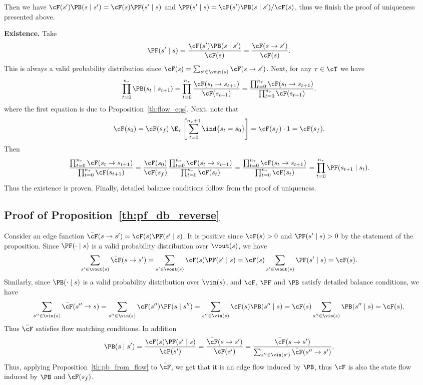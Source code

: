 Then we have $\cF(s') \PB(s \mid s') = \cF(s)\PF(s' \mid s)$ and $\PF(s' \mid s) = \cF(s') \PB(s \mid s') / \cF(s)$, thus we finish the proof of uniqueness presented above.


\textbf{Existence.} Take 
$$\PF(s' \mid s) = \frac{\cF(s') \PB(s \mid s')}{\cF(s)} = \frac{\cF(s \to s')}{\cF(s)}.$$ 
This is always a valid probability distribution since $\cF(s) = \sum_{s' \in \vout(s)} \cF(s \to s')$. Next, for any $\tau \in \cT$ we have 
$$\prod_{t = 0}^{n_\tau} \PB(s_t \mid s_{t + 1}) = \prod_{t = 0}^{n_\tau} \frac{\cF(s_t \to s_{t + 1})}{\cF(s_{t+1})} = \frac{\prod_{t = 0}^{n_\tau} \cF(s_t \to s_{t + 1})}{\prod_{t = 0}^{n_\tau} \cF(s_{t+1})}.$$
where the first equation is due to Proposition~\ref{th:flow_eqs}. Next, note that $$\cF(s_0) = \cF(s_f)\;\E_{\tau }\left[ \sum_{t = 0}^{n_{\tau}+1} \ind\{s_t = s_0\}\right] = \cF(s_f) \cdot 1 = \cF(s_f).$$
Then 
$$\frac{\prod_{t = 0}^{n_\tau} \cF(s_t \to s_{t + 1})}{\prod_{t = 0}^{n_\tau} \cF(s_{t+1})} = \frac{\cF(s_0)}{\cF(s_f)}\frac{\prod_{t = 0}^{n_\tau} \cF(s_t \to s_{t + 1})}{\prod_{t = 0}^{n_\tau} \cF(s_{t})} = \frac{\prod_{t = 0}^{n_\tau} \cF(s_t \to s_{t + 1})}{\prod_{t = 0}^{n_\tau} \cF(s_{t})} = \prod_{t = 0}^{n_\tau} \PF(s_{t+1} \mid s_{t}).$$
Thus the existence is proven. Finally, detailed balance conditions follow from the proof of uniqueness.

\subsection{Proof of Proposition~\ref{th:pf_db_reverse}}\label{app:pf_db_reverse_proof}

Consider an edge function $\bar{\cF}(s \to s') = \cF(s)\PF(s' \mid s)$. It is positive since $\cF(s) > 0$ and $\PF(s' \mid s) > 0$ by the statement of the proposition. Since $\PF(\cdot \mid s)$ is a valid probability distribution over $\vout(s)$, we have 
$$\sum_{s' \in \vout(s)}\bar{\cF}(s \to s') = \sum_{s' \in \vout(s)}\cF(s)\PF(s' \mid s) = \cF(s)\sum_{s' \in \vout(s)}\PF(s' \mid s) = \cF(s).$$
Similarly, since $\PB(\cdot \mid s)$ is a valid probability distribution over $\vin(s)$, and $\cF$, $\PF$ and $\PB$ satisfy detailed balance conditions, we have
$$\sum_{s'' \in \vin(s)}\bar{\cF}(s'' \to s) = \sum_{s'' \in \vin(s)}\cF(s'')\PF(s \mid s'') = \sum_{s'' \in \vin(s)}\cF(s)\PB(s'' \mid s) = \cF(s)\sum_{s'' \in \vin(s)}\PB(s'' \mid s) = \cF(s).$$
Thus $\bar{\cF}$ satisfies flow matching conditions. In addition 
$$
\PB(s \mid s') = \frac{\cF(s)\PF(s' \mid s)}{\cF(s')} = \frac{\bar{\cF}(s \to s')}{\cF(s')} = \frac{\bar{\cF}(s \to s')}{\sum_{s'' \in \vin(s')}\bar{\cF}(s'' \to s')}.
$$
Thus, applying Proposition~\ref{th:pb_from_flow} to $\bar{\cF}$, we get that it is an edge flow induced by $\PB$, thus $\cF$ is also the state flow induced by $\PB$ and $\cF(s_f)$.

